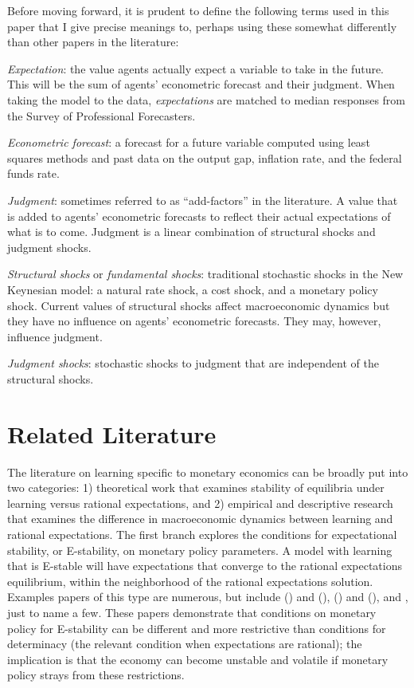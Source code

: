 \documentclass[10pt]{article}
\newcommand{\bd}{\begin{description}}
\newcommand{\ed}{\end{description}}
\newcommand{\citee}[1]{\citet{#1}}
\begin{document}
Before moving forward, it is prudent to define the following terms used in this paper that I give precise meanings to, perhaps using these somewhat differently than other papers in the literature:
\bd
\item \textit{Expectation}: the value agents actually expect a variable to take in the future.  This will be the sum of agents' econometric forecast and their judgment.  When taking the model to the data, \textit{expectations} are matched to median responses from the Survey of Professional Forecasters.
\item \textit{Econometric forecast}: a forecast for a future variable computed using least squares methods and past data on the output gap, inflation rate, and the federal funds rate.
\item \textit{Judgment}: sometimes referred to as ``add-factors'' in the literature.  A value that is added to agents' econometric forecasts to reflect their actual expectations of what is to come.  Judgment is a linear combination of structural shocks and judgment shocks.  
\item \textit{Structural shocks} or \textit{fundamental shocks}: traditional stochastic shocks in the New Keynesian model: a natural rate shock, a cost shock, and a monetary policy shock.  Current values of structural shocks affect macroeconomic dynamics but they have no influence on agents' econometric forecasts.  They may, however, influence judgment.
\item \textit{Judgment shocks}: stochastic shocks to judgment that are independent of the structural shocks.
\ed

\section{Related Literature}

The literature on learning specific to monetary economics can be broadly put into two categories: 1) theoretical work that examines stability of equilibria under learning versus rational expectations, and 2) empirical and descriptive research that examines the difference in macroeconomic dynamics between learning and rational expectations.  The first branch explores the conditions for expectational stability, or E-stability, on monetary policy parameters.  A model with learning that is E-stable will have expectations that converge to the rational expectations equilibrium, within the neighborhood of the rational expectations solution.  Examples papers of this type are numerous, but include \citeauthor*{bullardmitra2002} (\citeyear{bullardmitra2002}) and (\citeyear{bullardmitra2007}), \citeauthor*{eh2003} (\citeyear{eh2003b}) and (\citeyear{eh2003}), and \citee{preston2005}, just to name a few.  These papers demonstrate that conditions on monetary policy for E-stability can be different and more restrictive than conditions for determinacy (the relevant condition when expectations are rational); the implication is that the economy can become unstable and volatile if monetary policy strays from these restrictions.
\end{document}
